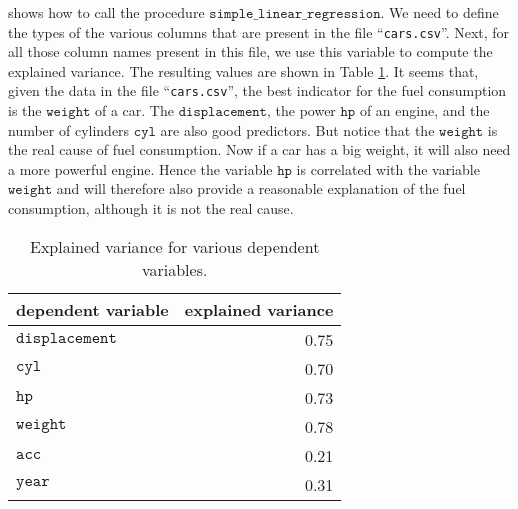  shows how to call the procedure
$\mathtt{simple\_linear\_regression}$.  We need to define the types of the various columns that are present in
the file ``\texttt{cars.csv}''.  Next, for all those column names present in this file, we use this variable to
compute the explained variance.  The resulting values are shown in Table \ref{tab:explained-variance}.  It
seems that, given the data in the file ``\texttt{cars.csv}'', the best indicator for the fuel consumption is
the $\mathtt{weight}$ of a car.  The $\mathtt{displacement}$, the power $\mathtt{hp}$ of an engine, and the
number of cylinders $\mathtt{cyl}$ are also
good predictors.  But notice that the $\mathtt{weight}$ is the real cause of fuel consumption.  Now if a car
has a big weight, it will also need a more powerful engine.  Hence the variable $\mathtt{hp}$ is correlated
with the variable $\mathtt{weight}$ and will therefore also provide a reasonable explanation of the fuel
consumption, although it is not the real cause.


\begin{table}
  \centering
  \begin{tabular}{|l|r|}
  \hline
  dependent variable      & explained variance   \\
  \hline
  \hline
  $\mathtt{displacement}$ & 0.75                 \\
  \hline
  $\mathtt{cyl}$          & 0.70                 \\
  \hline
  $\mathtt{hp}$           & 0.73                 \\
  \hline
  $\mathtt{weight}$       & 0.78                 \\
  \hline
  $\mathtt{acc}$          & 0.21                 \\
  \hline
  $\mathtt{year}$         & 0.31                 \\
  \hline
  \end{tabular}
  \caption[explained variance]{Explained variance for various dependent variables.}
  \label{tab:explained-variance}
\end{table}

